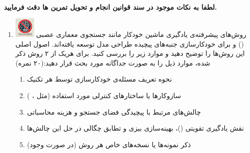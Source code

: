 \documentclass[12pt]{article}
\begin{document}
\fontsize{12pt}{14pt}\selectfont



\\
{\fontsize{14}{22}\selectfont \textbf{لطفا به نکات موجود در سند قوانین انجام و تحویل تمرین ها دقت فرمایید. }}

\begin{enumerate}

    \section*{سوالات تئوری}
    \item \includegraphics[width=1cm]{figs/Forbidden_AI.jpg}
    روش‌های پیشرفته‌ی یادگیری ماشین خودکار مانند جستجوی معماری عصبی () و   برای خودکارسازی جنبه‌های پیچیده طراحی مدل توسعه یافته‌اند. اصول اصلی این روش‌ها را توضیح دهید و موارد زیر را بررسی کنید. برای هریک از ۲ روش ذکر شده، موارد ذیل را به صورت جداگانه مورد بحث قرار دهید:(۲۰ نمره)
    
    \begin{enumerate}
        \item نحوه تعریف مسئله‌ی خودکارسازی توسط هر تکنیک
        \item سازوکارها یا ساختارهای کنترلی مورد استفاده (مثل ، )
        \item چالش‌های مرتبط با پیچیدگی فضای جستجو و هزینه محاسباتی
        \item نقش یادگیری تقویتی ()، بهینه‌سازی بیزی و تطابق چگالی در حل این چالش‌ها
        \item ذکر نمونه‌ها یا نسخه‌های خاص هر روش (در صورت وجود)
    \end{enumerate}


\end{enumerate}
\end{document}

